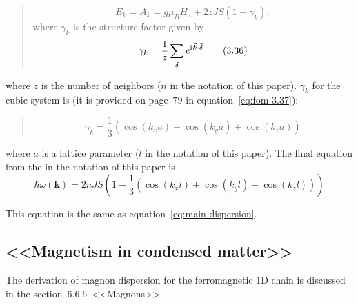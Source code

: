     \begin{quote}
        \begin{equation}
            E_k = A_k = g\mu_B H_z + 2zJS(1 - \gamma_k), \label{eq:fom-3.35} \tag{3.35}
        \end{equation}
        where $\gamma_k$ is the structure factor given by
        \begin{equation}
            \gamma_k = \dfrac{1}{z}\sum_{\vec{\delta}}e^{\mathrm{i}\mkern1mu \vec{k}\cdot\vec{\delta}} \label{eq:fom-3.36} \tag{3.36}
        \end{equation}
    \end{quote}
    where $z$ is the number of neighbors ($n$ in the notation of this paper). $\gamma_k$ for the cubic system is (it is provided on page~$79$ in equation~\eqref{eq:fom-3.37}):
    \begin{quote}
        \begin{equation}
            \gamma_k = \dfrac{1}{3}(\cos(k_xa) + \cos(k_ya) + \cos(k_za)) \label{eq:fom-3.37} \tag{3.37}
        \end{equation}
    \end{quote}
    where $a$ is a lattice parameter ($l$ in the notation of this paper). The final equation from the \cite{rezende2020fundamentals} in the notation of this paper is
    \begin{equation}
        \hbar\omega(\mathbf{k}) = 2nJS\left(1 - \dfrac{1}{3}\left(\cos(k_xl) + \cos(k_yl) + \cos(k_zl)\right)\right)
        \label{eq:rezende}
    \end{equation}

    This equation is the same as equation~\eqref{eq:main-dispersion}.

\subsection{<<Magnetism in condensed matter>>\cite{blundell2003magnetism}}
    The derivation of magnon dispersion for the ferromagnetic 1D chain is discussed in the section~$6.6.6$~<<Magnons>>.


